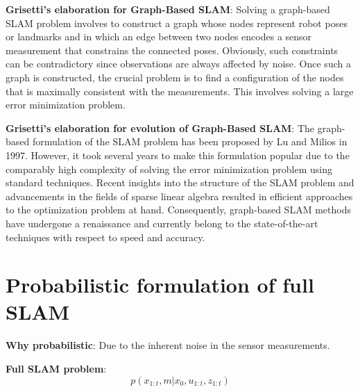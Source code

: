 \textbf{Grisetti's elaboration for Graph-Based SLAM}: Solving a graph-based SLAM problem involves to construct a graph whose nodes represent robot poses or landmarks and in which an edge between two nodes encodes a sensor measurement that constrains the connected poses. Obviously, such constraints can be contradictory since observations are always affected by noise. Once such a graph is constructed, the crucial problem is to find a configuration of the nodes that is maximally consistent with the measurements. This involves solving a large error minimization problem. 

\textbf{Grisetti's elaboration for evolution of Graph-Based SLAM}: The graph-based formulation of the SLAM problem has been proposed by Lu and Milios in 1997. However, it took several years to make this formulation popular due to the comparably high complexity of solving the error minimization problem using standard techniques. Recent insights into the structure of the SLAM problem and advancements in the fields of sparse linear algebra resulted in efficient approaches to the optimization problem at hand. Consequently, graph-based SLAM methods have undergone a renaissance and currently belong to the state-of-the-art techniques with respect to speed and accuracy.

\section{Probabilistic formulation of full SLAM}
\textbf{Why probabilistic}: Due to the inherent noise in the sensor measurements. 

\textbf{Full SLAM problem}: 
\begin{equation}
    p(x_{1:t}, m | x_0, u_{1:t}, z_{1:t})
    \label{equ:full_slam_prob}
\end{equation}

